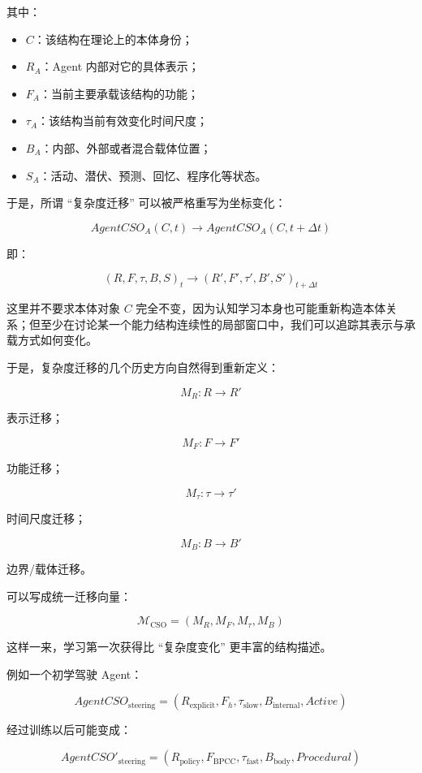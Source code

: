 其中：

\begin{itemize}
    \item $C$：该结构在理论上的本体身份；
    \item $R_A$：Agent 内部对它的具体表示；
    \item $F_A$：当前主要承载该结构的功能；
    \item $\tau_A$：该结构当前有效变化时间尺度；
    \item $B_A$：内部、外部或者混合载体位置；
    \item $S_A$：活动、潜伏、预测、回忆、程序化等状态。
\end{itemize}

于是，所谓 ``复杂度迁移'' 可以被严格重写为坐标变化：

\[
AgentCSO_A(C,t)
\rightarrow
AgentCSO_A(C,t+\Delta t)
\]

即：

\[
(R,F,\tau,B,S)_t
\rightarrow
(R',F',\tau',B',S')_{t+\Delta t}
\]

这里并不要求本体对象 $C$ 完全不变，因为认知学习本身也可能重新构造本体关系；但至少在讨论某一个能力结构连续性的局部窗口中，我们可以追踪其表示与承载方式如何变化。

于是，复杂度迁移的几个历史方向自然得到重新定义：

\[
\boxed{
M_R:
R\rightarrow R'
}
\]

表示迁移；

\[
\boxed{
M_F:
F\rightarrow F'
}
\]

功能迁移；

\[
\boxed{
M_\tau:
\tau\rightarrow\tau'
}
\]

时间尺度迁移；

\[
\boxed{
M_B:
B\rightarrow B'
}
\]

边界/载体迁移。

可以写成统一迁移向量：

\[
\boxed{
\mathcal M_{\mathrm{CSO}}
=
(
M_R,
M_F,
M_\tau,
M_B
)
}
\]

这样一来，学习第一次获得比 ``复杂度变化'' 更丰富的结构描述。

例如一个初学驾驶 Agent：

\[
AgentCSO_{\mathrm{steering}}
=
(
R_{\mathrm{explicit}},
F_h,
\tau_{\mathrm{slow}},
B_{\mathrm{internal}},
Active
)
\]

经过训练以后可能变成：

\[
AgentCSO'_{\mathrm{steering}}
=
(
R_{\mathrm{policy}},
F_{\mathrm{BPCC}},
\tau_{\mathrm{fast}},
B_{\mathrm{body}},
Procedural
)
\]

